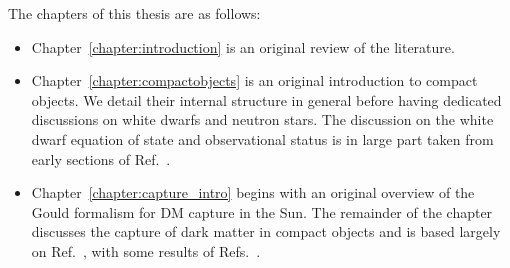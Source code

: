 \begin{preface}
The chapters of this thesis are as follows:
\begin{itemize}
    \item Chapter~\ref{chapter:introduction} is an original review of the literature.
    \item Chapter~\ref{chapter:compactobjects} is an original introduction to compact objects. We detail their internal structure in general before having dedicated discussions on white dwarfs and neutron stars. The discussion on the white dwarf equation of state and observational status is in large part taken from early sections of Ref.~\cite{Bell:2021fye_oct_Improvedtreatmentdark}.
    \item Chapter~\ref{chapter:capture_intro} begins with an original overview of the Gould formalism for DM capture in the Sun. The remainder of the chapter discusses the capture of dark matter in compact objects and is based largely on Ref.~\cite{Bell:2020jou_sep_ImprovedTreatmentDark}, with some results of Refs.~\cite{Bell:2020lmm_mar_ImprovedTreatmentDark, Anzuini:2021lnv_nov_Improvedtreatmentdark}. 
\end{itemize}
\end{preface}
